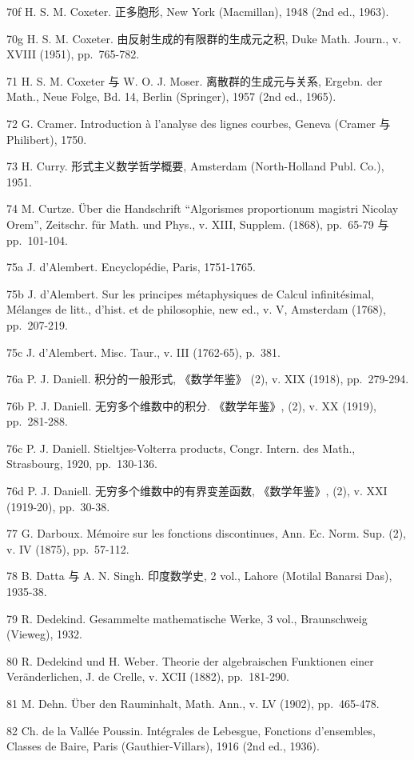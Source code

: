 70f H. S. M. Coxeter. 正多胞形, New York (Macmillan), 1948 (2nd ed., 1963).

70g H. S. M. Coxeter. 由反射生成的有限群的生成元之积, Duke Math. Journ., v. XVIII (1951), pp.~765-782.

71 H. S. M. Coxeter 与 W. O. J. Moser. 离散群的生成元与关系, Ergebn. der Math., Neue Folge, Bd. 14, Berlin (Springer), 1957 (2nd ed., 1965).

72 G. Cramer. Introduction à l'analyse des lignes courbes, Geneva (Cramer 与 Philibert), 1750.

73 H. Curry. 形式主义数学哲学概要, Amsterdam (North-Holland Publ. Co.), 1951.

74 M. Curtze. Über die Handschrift ``Algorismes proportionum magistri Nicolay Orem'', Zeitschr. für Math. und Phys., v. XIII, Supplem. (1868), pp.~65-79 与 pp.~101-104.

75a J. d'Alembert. Encyclopédie, Paris, 1751-1765.

75b J. d'Alembert. Sur les principes métaphysiques de Calcul infinitésimal, Mélanges de litt., d'hist. et de philosophie, new ed., v. V, Amsterdam (1768), pp.~207-219.

75c J. d'Alembert. Misc. Taur., v. III (1762-65), p.~381.

76a P. J. Daniell. 积分的一般形式, 《数学年鉴》 (2), v. XIX (1918), pp.~279-294.

76b P. J. Daniell. 无穷多个维数中的积分. 《数学年鉴》, (2), v. XX (1919), pp.~281-288.

76c P. J. Daniell. Stieltjes-Volterra products, Congr. Intern. des Math., Strasbourg, 1920, pp.~130-136.

76d P. J. Daniell. 无穷多个维数中的有界变差函数, 《数学年鉴》, (2), v. XXI (1919-20), pp.~30-38.

77 G. Darboux. Mémoire sur les fonctions discontinues, Ann. Ec. Norm. Sup. (2), v. IV (1875), pp.~57-112.

78 B. Datta 与 A. N. Singh. 印度数学史, 2 vol., Lahore (Motilal Banarsi Das), 1935-38.

79 R. Dedekind. Gesammelte mathematische Werke, 3 vol., Braunschweig (Vieweg), 1932.

80 R. Dedekind und H. Weber. Theorie der algebraischen Funktionen einer Veränderlichen, J. de Crelle, v. XCII (1882), pp.~181-290.

81 M. Dehn. Über den Rauminhalt, Math. Ann., v. LV (1902), pp.~465-478.

82 Ch. de la Vallée Poussin. Intégrales de Lebesgue, Fonctions d'ensembles, Classes de Baire, Paris (Gauthier-Villars), 1916 (2nd ed., 1936).

